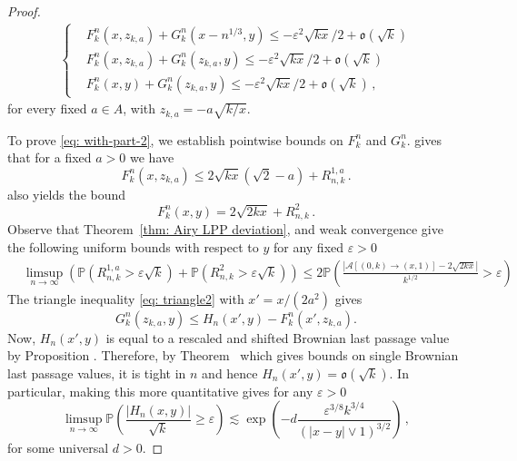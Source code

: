 \documentclass[11pt, reqno]{amsart}
\numberwithin{equation}{section}
\newcommand{\PP}{\ensuremath{\mathbb{P}}}
\begin{document}
\begin{proof}
\begin{align}\label{eq: with-part-2}
    \begin{cases}
        &F^n_k(x, z_{k,a})+G^n_k(x-n^{1/3}, y) \le -\varepsilon^2\sqrt{kx}/2 + \mathfrak{o}(\sqrt{k})\\
        &F^n_k(x, z_{k, a})+G^n_k(z_{k, a}, y) \le -\varepsilon^2\sqrt{kx}/2 + \mathfrak{o}(\sqrt{k})\\
        &F^n_k(x, y)+G^n_k(z_{k, a}, y) \le -\varepsilon^2\sqrt{kx}/2 + \mathfrak{o}(\sqrt{k})\,,
    \end{cases}
\end{align}
for every fixed $a\in A$, with $z_{k, a} =  - a\sqrt{k/x}$.  
\medskip

To prove \eqref{eq: with-part-2}, we establish pointwise bounds on $F^n_k$ and $G^n_k$. \cite[Proposition 6.1]{DOV} gives that for a fixed $a > 0$ we have
\begin{equation*}
    \label{eq: Fnk-bound-2}
    F^n_k(x, z_{k, a}) \le  2\sqrt{kx}(\sqrt{2} - a) +  R^{1,a}_{n,k}\,.
\end{equation*}
\cite[Proposition 6.1]{DOV} also yields the bound
\begin{equation}
    \label{eq: Fnk-bound}
    F^n_k(x, y) = 2\sqrt{2kx}  + R^{2}_{n,k}\,.
\end{equation}
Observe that Theorem~\ref{thm: Airy LPP deviation}, \cite[Proposition 6.1]{DOV} and weak convergence give the following uniform bounds with respect to $y$ for any fixed $\varepsilon > 0$ 
\begin{align*}
& \displaystyle\limsup_{n\to\infty}\left(\PP(R^{1,a}_{n,k}>\varepsilon \sqrt{k})+ \PP(R^{2}_{n,k}>\varepsilon \sqrt{k})\right)\le 2\PP \left(\frac{|\mathcal{A}[ (0, k) \rightarrow (x,1) ]-{2\sqrt{2kx}}|}{k^{1/2}} > \varepsilon\right)
\end{align*}
The triangle inequality \eqref{eq: triangle2} with   $x'=  x/(2a^2)$ gives
\begin{equation*}
    G^n_k(z_{k, a}, y) \le H_n(x', y) - F^n_k(x', z_{k, a}).
\end{equation*}
Now, $H_n(x', y)$ is equal to a rescaled and shifted Brownian last passage value by Proposition \cite[Proposition 4.1]{DOV}. Therefore, by Theorem~\cite[Theorem~2.5]{DOV} which gives bounds on single Brownian last passage values, it is tight in $n$ and hence $H_n(x', y)  = \mathfrak{o}(\sqrt{k})$. In particular, making this more quantitative gives for any $\varepsilon > 0$
\begin{equation*}
\displaystyle\limsup_{n\to \infty}\PP\left(\frac{|H_n(x,y)|}{\sqrt{k}}\ge 
\varepsilon\right)\lesssim \exp\left(-d\frac{\varepsilon^{3/8}k^{3/4}}{(|x-y|\lor 1)^{3/2}}\right)\,,
\end{equation*}
for some universal $d>0$. 


\end{proof}
\end{document}
